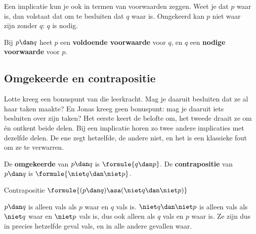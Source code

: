 Een implicatie kun je ook in termen van voorwaarden zeggen. Weet je dat $p$ waar is, dan volstaat dat om te besluiten dat $q$ waar is. Omgekeerd kan $p$ niet waar zijn zonder $q$: $q$ is nodig.

\begin{theorie}
Bij $p \dan q$ heet $p$ een \textbf{\textcolor{accent}{voldoende voorwaarde}} voor $q$, en $q$ een \textbf{\textcolor{accent}{nodige voorwaarde}} voor $p$.
\end{theorie}


\begin{oefeningen}
\end{oefeningen}

\subsection{Omgekeerde en contrapositie}\label{sec:h1-contrapositie}

Lotte kreeg een bonuspunt van die leerkracht. Mag je daaruit besluiten dat ze al haar taken maakte? En Jonas kreeg geen bonuspunt: mag je daaruit iets besluiten over zijn taken? Het eerste keert de belofte om, het tweede draait ze om én ontkent beide delen. Bij een implicatie horen zo twee andere implicaties met dezelfde delen. De ene zegt hetzelfde, de andere niet, en het is een klassieke fout om ze te verwarren.

\begin{theorie}
De \textbf{\textcolor{accent}{omgekeerde}} van $p \dan q$ is $\formule{q \dan p}$. De \textbf{\textcolor{accent}{contrapositie}} van $p \dan q$ is $\formule{\niet q \dan \niet p}$.

\begin{stelling}{Contrapositie}
\qquad $\formule{(p \dan q) \asa (\niet q \dan \niet p)}$
\end{stelling}

\begin{bewijs}
$p \dan q$ is alleen vals als $p$ waar en $q$ vals is. $\niet q \dan \niet p$ is alleen vals als $\niet q$ waar en $\niet p$ vals is, dus ook alleen als $q$ vals en $p$ waar is. Ze zijn dus in precies hetzelfde geval vals, en in alle andere gevallen waar.
\end{bewijs}
\end{theorie}

